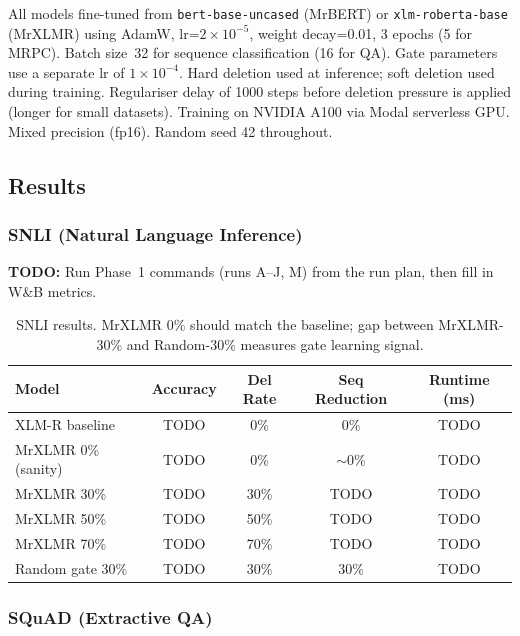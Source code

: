 \documentclass[11pt,a4paper]{article}
\newcommand{\todo}[1]{\begin{mdframed}[style=todostyle]\textcolor{todocolor}{\textbf{TODO:}} #1\end{mdframed}}
\begin{document}
All models fine-tuned from \texttt{bert-base-uncased} (MrBERT) or \texttt{xlm-roberta-base} (MrXLMR) using AdamW, lr=$2 \times 10^{-5}$, weight decay=0.01, 3 epochs (5 for MRPC). Batch size~32 for sequence classification (16 for QA). Gate parameters use a separate lr of $1 \times 10^{-4}$. Hard deletion used at inference; soft deletion used during training. Regulariser delay of 1000 steps before deletion pressure is applied (longer for small datasets). Training on NVIDIA A100 via Modal serverless GPU. Mixed precision (fp16). Random seed 42 throughout.


\subsection{Results}
\label{sec:results}

\subsubsection{SNLI (Natural Language Inference)}

\todo{Run Phase~1 commands (runs A--J, M) from the run plan, then fill in W\&B metrics.}

\begin{table}[h]
\centering
\begin{tabular}{@{}lcccc@{}}
\toprule
\textbf{Model} & \textbf{Accuracy} & \textbf{Del Rate} & \textbf{Seq Reduction} & \textbf{Runtime (ms)} \\
\midrule
XLM-R baseline       & TODO & 0\%  & 0\%  & TODO \\
MrXLMR 0\% (sanity)  & TODO & 0\%  & $\sim$0\% & TODO \\
MrXLMR 30\%          & TODO & 30\% & TODO & TODO \\
MrXLMR 50\%          & TODO & 50\% & TODO & TODO \\
MrXLMR 70\%          & TODO & 70\% & TODO & TODO \\
Random gate 30\%     & TODO & 30\% & 30\% & TODO \\
\bottomrule
\end{tabular}
\caption{SNLI results. MrXLMR 0\% should match the baseline; gap between MrXLMR-30\% and Random-30\% measures gate learning signal.}
\label{tab:snli-results}
\end{table}

\subsubsection{SQuAD (Extractive QA)}
\end{document}
